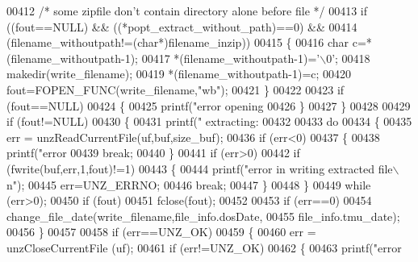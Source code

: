 \begin{DoxyCode}
{{{{{{{{{{{{{00412             \textcolor{comment}{/* some zipfile don't contain directory alone before file */}
00413             \textcolor{keywordflow}{if} ((fout==NULL) && ((*popt\_extract\_without\_path)==0) &&
00414                                 (filename\_withoutpath!=(\textcolor{keywordtype}{char}*)filename\_inzip))
00415             \{
00416                 \textcolor{keywordtype}{char} c=*(filename\_withoutpath-1);
00417                 *(filename\_withoutpath-1)=\textcolor{charliteral}{'\(\backslash\)0'};
00418                 makedir(write\_filename);
00419                 *(filename\_withoutpath-1)=c;
00420                 fout=FOPEN\_FUNC(write\_filename,\textcolor{stringliteral}{"wb"});
00421             \}
00422 
00423             \textcolor{keywordflow}{if} (fout==NULL)
00424             \{
00425                 printf(\textcolor{stringliteral}{"error opening %
00426             \}
00427         \}
00428 
00429         \textcolor{keywordflow}{if} (fout!=NULL)
00430         \{
00431             printf(\textcolor{stringliteral}{" extracting: %
00432 
00433             \textcolor{keywordflow}{do}
00434             \{
00435                 err = unzReadCurrentFile(uf,buf,size\_buf);
00436                 \textcolor{keywordflow}{if} (err<0)
00437                 \{
00438                     printf(\textcolor{stringliteral}{"error %
00439                     \textcolor{keywordflow}{break};
00440                 \}
00441                 \textcolor{keywordflow}{if} (err>0)
00442                     \textcolor{keywordflow}{if} (fwrite(buf,err,1,fout)!=1)
00443                     \{
00444                         printf(\textcolor{stringliteral}{"error in writing extracted file\(\backslash\)n"});
00445                         err=UNZ\_ERRNO;
00446                         \textcolor{keywordflow}{break};
00447                     \}
00448             \}
00449             \textcolor{keywordflow}{while} (err>0);
00450             \textcolor{keywordflow}{if} (fout)
00451                     fclose(fout);
00452 
00453             \textcolor{keywordflow}{if} (err==0)
00454                 change\_file\_date(write\_filename,file\_info.dosDate,
00455                                  file\_info.tmu\_date);
00456         \}
00457 
00458         \textcolor{keywordflow}{if} (err==UNZ\_OK)
00459         \{
00460             err = unzCloseCurrentFile (uf);
00461             \textcolor{keywordflow}{if} (err!=UNZ\_OK)
00462             \{
00463                 printf(\textcolor{stringliteral}{"error %
}}}}}}}}}}}}}}}}}
\end{DoxyCode}

